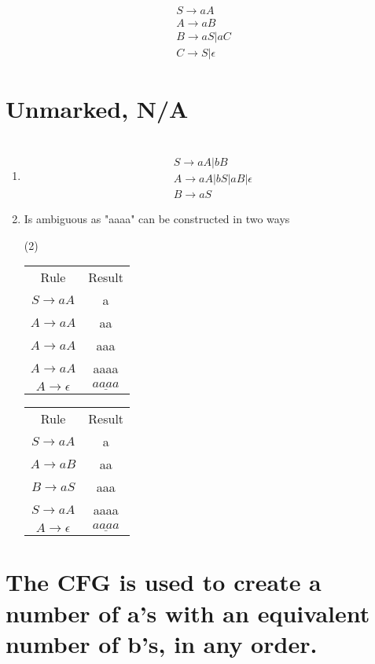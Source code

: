 \documentclass{article} %
\begin{document}
    \section{}
            \begin{gather*}
                S \to aA\\
                A \to aB\\
                B \to aS | aC\\
                C \to S | \epsilon
            \end{gather*}
    \section{Unmarked, N/A}
    \section{}
        \begin{enumerate}

            \item
            \begin{gather*}
                S \to aA | bB\\
                A \to aA | bS | aB | \epsilon\\
                B \to aS
            \end{gather*}
            \item Is ambiguous as "aaaa" can be constructed in two ways
            \begin{center}
                \begin{varwidth}{\textwidth}
                \begin{tasks}[label={(\Roman*)},label-width={1cm}](2)
                    \task
                    \begin{tabular}{ c c}
                        Rule & Result\\
                        $S \to aA$ & a\\
                        $A \to aA$ & aa\\
                        $A \to aA$ & aaa\\
                        $A \to aA$ & aaaa\\
                        $A \to \epsilon$ & $\underline{aaaa}$
                    \end{tabular}

                    \task
                    \begin{tabular}{ c c}
                        Rule & Result\\
                        $S \to aA$ & a\\
                        $A \to aB$ & aa\\
                        $B \to aS$ & aaa\\
                        $S \to aA$ & aaaa\\
                        $A \to \epsilon$ & $\underline{aaaa}$
                    \end{tabular}
                \end{tasks}
                \end{varwidth}
            \end{center}
        \end{enumerate}
    \section{ The CFG is used to create a number of a's with an equivalent number of b's, in any order.}
\end{document}
